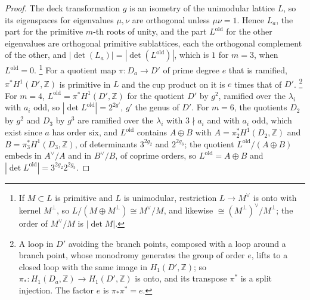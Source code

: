 \documentclass[11pt,reqno]{amsart}
\theoremstyle{plain}
\theoremstyle{definition}
\theoremstyle{remark}
\newcommand{\ZZ}{\mathbb{Z}}
\begin{document}
\begin{proof}
The deck transformation $g$ is an isometry of the unimodular lattice $L$, so
its eigenspaces for eigenvalues $\mu,\nu$ are orthogonal unless $\mu\nu=1$.
Hence $L_{a}$, the part for the primitive $m$-th roots of unity, and the
part $L^{\mathrm{old}}$ for the other eigenvalues are orthogonal primitive
sublattices, each the orthogonal complement of the other, and
$|\det(L_{a})|=|\det(L^{\mathrm{old}})|$, which is $1$ for $m=3$, when
$L^{\mathrm{old}}=0$.%
\footnote{If $M\subset L$ is primitive and $L$ is unimodular, restriction
$L\to M^{\vee}$ is onto with kernel $M^{\perp}$, so $L/(M\oplus M^{\perp})\cong
M^{\vee}/M$, and likewise $\cong(M^{\perp})^{\vee}/M^{\perp}$; the order of
$M^{\vee}/M$ is $|\det M|$.} For a quotient map $\pi\colon D_{a}\to D'$ of
prime degree $e$ that is ramified, $\pi^{*}H^{1}(D',\ZZ)$ is primitive in $L$
and the cup product on it is $e$ times that of $D'$.%
\footnote{A loop in $D'$ avoiding the branch points, composed with a loop
around a branch point, whose monodromy generates the group of order $e$,
lifts to a closed loop with the same image in $H_{1}(D',\ZZ)$; so
$\pi_{*}\colon H_{1}(D_{a},\ZZ)\to H_{1}(D',\ZZ)$ is onto, and its transpose
$\pi^{*}$ is a split injection. The factor $e$ is $\pi_{*}\pi^{*}=e$.} For
$m=4$, $L^{\mathrm{old}}=\pi^{*}H^{1}(D',\ZZ)$ for the quotient $D'$ by $g^{2}$,
ramified over the $\lambda_{i}$ with $a_{i}$ odd, so
$|\det L^{\mathrm{old}}|=2^{2g'}$, $g'$ the genus of $D'$. For $m=6$, the
quotients $D_{2}$ by $g^{2}$ and $D_{3}$ by $g^{3}$ are ramified over the
$\lambda_{i}$ with $3\nmid a_{i}$ and with $a_{i}$ odd, which exist since $a$
has order six, and $L^{\mathrm{old}}$ contains $A\oplus B$ with
$A=\pi_{2}^{*}H^{1}(D_{2},\ZZ)$ and $B=\pi_{3}^{*}H^{1}(D_{3},\ZZ)$, of determinants
$3^{2g_{2}}$ and $2^{2g_{3}}$; the quotient $L^{\mathrm{old}}/(A\oplus B)$ embeds in
$A^{\vee}/A$ and in $B^{\vee}/B$, of coprime orders, so $L^{\mathrm{old}}=A\oplus B$
and $|\det L^{\mathrm{old}}|=3^{2g_{2}}2^{2g_{3}}$.


\end{proof}
\end{document}
